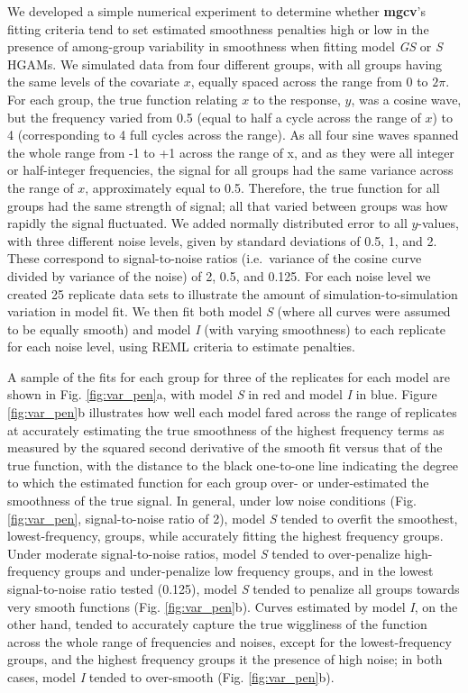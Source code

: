 \documentclass[12pt]{article}
\begin{document}
We developed a simple numerical experiment to determine whether
\textbf{mgcv}'s fitting criteria tend to set estimated smoothness
penalties high or low in the presence of among-group variability in
smoothness when fitting model \emph{GS} or \emph{S} HGAMs. We simulated
data from four different groups, with all groups having the same levels
of the covariate \(x\), equally spaced across the range from 0 to
\(2\pi\). For each group, the true function relating \(x\) to the
response, \(y\), was a cosine wave, but the frequency varied from 0.5
(equal to half a cycle across the range of \(x\)) to 4 (corresponding to
4 full cycles across the range). As all four sine waves spanned the
whole range from -1 to +1 across the range of x, and as they were all
integer or half-integer frequencies, the signal for all groups had the
same variance across the range of \(x\), approximately equal to 0.5.
Therefore, the true function for all groups had the same strength of
signal; all that varied between groups was how rapidly the signal
fluctuated. We added normally distributed error to all \(y\)-values,
with three different noise levels, given by standard deviations of 0.5,
1, and 2. These correspond to signal-to-noise ratios (i.e.~variance of
the cosine curve divided by variance of the noise) of 2, 0.5, and 0.125.
For each noise level we created 25 replicate data sets to illustrate the
amount of simulation-to-simulation variation in model fit. We then fit
both model \emph{S} (where all curves were assumed to be equally smooth)
and model \emph{I} (with varying smoothness) to each replicate for each
noise level, using REML criteria to estimate penalties.

A sample of the fits for each group for three of the replicates for each
model are shown in Fig. \ref{fig:var_pen}a, with model \emph{S} in red
and model \emph{I} in blue. Figure \ref{fig:var_pen}b illustrates how
well each model fared across the range of replicates at accurately
estimating the true smoothness of the highest frequency terms as
measured by the squared second derivative of the smooth fit versus that
of the true function, with the distance to the black one-to-one line
indicating the degree to which the estimated function for each group
over- or under-estimated the smoothness of the true signal. In general,
under low noise conditions (Fig. \ref{fig:var_pen}, signal-to-noise
ratio of 2), model \emph{S} tended to overfit the smoothest,
lowest-frequency, groups, while accurately fitting the highest frequency
groups. Under moderate signal-to-noise ratios, model \emph{S} tended to
over-penalize high-frequency groups and under-penalize low frequency
groups, and in the lowest signal-to-noise ratio tested (0.125), model
\emph{S} tended to penalize all groups towards very smooth functions
(Fig. \ref{fig:var_pen}b). Curves estimated by model \emph{I}, on the
other hand, tended to accurately capture the true wiggliness of the
function across the whole range of frequencies and noises, except for
the lowest-frequency groups, and the highest frequency groups it the
presence of high noise; in both cases, model \emph{I} tended to
over-smooth (Fig. \ref{fig:var_pen}b).
\end{document}
